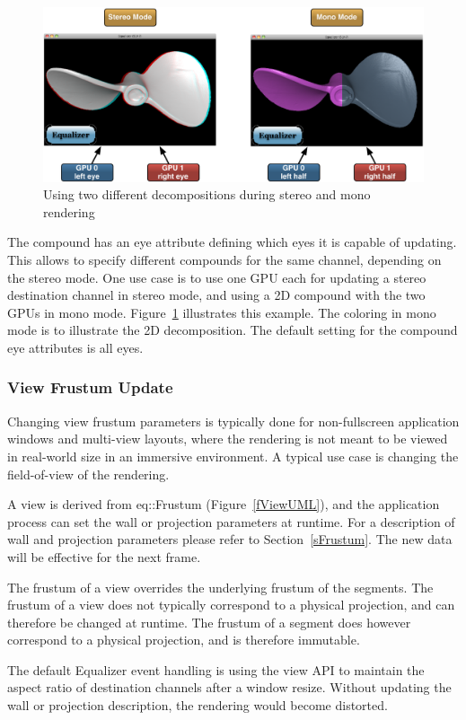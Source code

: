 \documentclass[10pt,a4]{scrartcl}
\newcommand{\fig}[1]{Figure~\ref{#1}}
\newcommand{\sref}[1]{Section~\ref{#1}}
\begin{document}
\begin{figure}
  \includegraphics[width=.618\textwidth]{images/stereoSwitch.pdf}
  {\caption{\label{fStereoSwitch}Using two different decompositions during
      stereo and mono rendering}}
\end{figure}
The compound has an \textsf{eye} attribute defining which eyes it is capable of
updating. This allows to specify different compounds for the same channel,
depending on the stereo mode. One use case is to use one GPU each for updating a
stereo destination channel in stereo mode, and using a 2D compound with the two
GPUs in mono mode. \fig{fStereoSwitch} illustrates this example. The coloring in
mono mode is to illustrate the 2D decomposition. The default setting for the
compound eye attributes is all eyes.

\subsubsection{View Frustum Update}

Changing view frustum parameters is typically done for non-fullscreen
application windows and multi-view layouts, where the rendering is not
meant to be viewed in real-world size in an immersive environment. A
typical use case is changing the field-of-view of the rendering.

A view is derived from \textsf{eq::Frustum} (\fig{fViewUML}), and the
application process can set the wall or projection parameters at
runtime. For a description of wall and projection parameters please refer
to \sref{sFrustum}. The new data will be effective for the next frame.

The frustum of a view overrides the underlying frustum of the
segments. The frustum of a view does not typically correspond to a
physical projection, and can therefore be changed at runtime. The
frustum of a segment does however correspond to a physical projection,
and is therefore immutable.

The default Equalizer event handling is using the view API to maintain
the aspect ratio of destination channels after a window resize. Without
updating the wall or projection description, the rendering would become
distorted.
\end{document}
